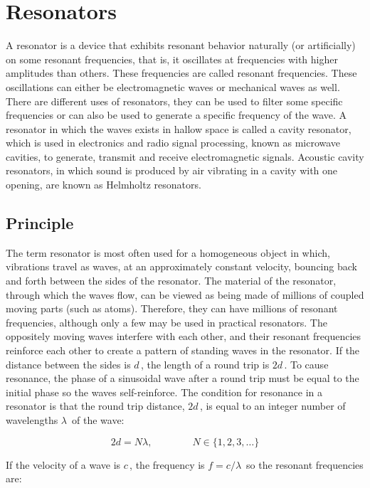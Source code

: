 \section{Resonators}
\normalfont \large A resonator is a device that exhibits resonant behavior naturally (or artificially) on some resonant frequencies, that is, it oscillates at frequencies with higher amplitudes than others. These frequencies are called resonant frequencies. These oscillations can either be electromagnetic waves or mechanical waves as well. There are different uses of resonators, they can be used to filter some specific frequencies or can also be used to generate a specific frequency of the wave. A resonator in which the waves exists in hallow space is called a cavity resonator, which is used in electronics and radio signal processing, known as microwave cavities, to generate, transmit and receive electromagnetic signals. Acoustic cavity resonators, in which sound is produced by air vibrating in a cavity with one opening, are known as Helmholtz resonators.
\subsection{Principle}
The term resonator is most often used for a homogeneous object in which, vibrations travel as waves, at an approximately constant velocity, bouncing back and forth between the sides of the resonator. The material of the resonator, through which the waves flow, can be viewed as being made of millions of coupled moving parts (such as atoms). Therefore, they can have millions of resonant frequencies, although only a few may be used in practical resonators. The oppositely moving waves interfere with each other, and their resonant frequencies reinforce each other to create a pattern of standing waves in the resonator. If the distance between the sides is ${\displaystyle d\,}$, the length of a round trip is ${\displaystyle 2d\,}$. To cause resonance, the phase of a sinusoidal wave after a round trip must be equal to the initial phase so the waves self-reinforce. The condition for resonance in a resonator is that the round trip distance, ${\displaystyle 2d\,}$, is equal to an integer number of wavelengths ${\displaystyle \lambda \,}$ of the wave:

$${\displaystyle 2d=N\lambda ,\qquad \qquad N\in \{1,2,3,\dots \}}$$

If the velocity of a wave is ${\displaystyle c\,}$, the frequency is ${\displaystyle f=c/\lambda \,}$ so the resonant frequencies are:

